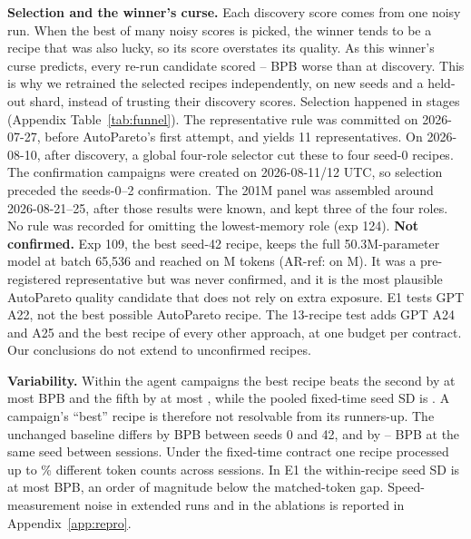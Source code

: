 \documentclass{article}
\newif\ifshowhumanmarkers \showhumanmarkersfalse
\newcommand{\humantag}[1]{{\color{humanframe}\sffamily\scriptsize\bfseries HUMAN AUTHOR MUST REWRITE/VERIFY [#1]}\ }
\newcommand{\humanauthor}[2][]{\ifshowhumanmarkers\begin{humanbox}\humantag{#1}#2\end{humanbox}\else #2\par\fi}
\begin{document}
\humanauthor[P2-09 r6]{ \textbf{Selection and the winner's curse.} Each discovery score comes from one noisy run. When the best of many noisy scores is picked, the winner tends to be a recipe that was also lucky, so its score overstates its quality. As this winner's curse predicts, every re-run candidate scored \CROptMin--\CROptMax{} BPB worse than at discovery. This is why we retrained the selected recipes independently, on new seeds and a held-out shard, instead of trusting their discovery scores. Selection happened in stages (Appendix Table~\ref{tab:funnel}). The representative rule was committed on 2026-07-27, before AutoPareto's first attempt, and yields 11 representatives. On 2026-08-10, after discovery, a global four-role selector cut these to four seed-0 recipes. The confirmation campaigns were created on 2026-08-11/12 UTC, so selection preceded the seeds-0--2 confirmation. The 201M panel was assembled around 2026-08-21--25, after those results were known, and kept three of the four roles. No rule was recorded for omitting the lowest-memory role (exp 124). \textbf{Not confirmed.} Exp 109, the best seed-42 recipe, keeps the full 50.3M-parameter model at batch 65,536 and reached \CRExpOneZeroNineBPB{} on \CRExpOneZeroNineTokens M tokens (AR-ref: \CRSeedFortyTwoAR{} on \CRExpSixEightTokens M). It was a pre-registered representative but was never confirmed, and it is the most plausible AutoPareto quality candidate that does not rely on extra exposure. E1 tests GPT A22, not the best possible AutoPareto recipe. The 13-recipe test adds GPT A24 and A25 and the best recipe of every other approach, at one budget per contract. Our conclusions do not extend to unconfirmed recipes.}

\humanauthor[P2-10 r6]{ \textbf{Variability.} Within the agent campaigns the best recipe beats the second by at most \CRGapTwoMax{} BPB and the fifth by at most \CRGapFiveMax, while the pooled fixed-time seed SD is \CRPooledSD. A campaign's ``best'' recipe is therefore not resolvable from its runners-up. The unchanged baseline differs by \CRBaseSeedEffect{} BPB between seeds 0 and 42, and by \CRSessionLo--\CRSessionHi{} BPB at the same seed between sessions. Under the fixed-time contract one recipe processed up to \CRTokenSpreadMax\% different token counts across sessions. In E1 the within-recipe seed SD is at most \CREOneMaxSD{} BPB, an order of magnitude below the matched-token gap. Speed-measurement noise in extended runs and in the ablations is reported in Appendix~\ref{app:repro}.}
\end{document}
